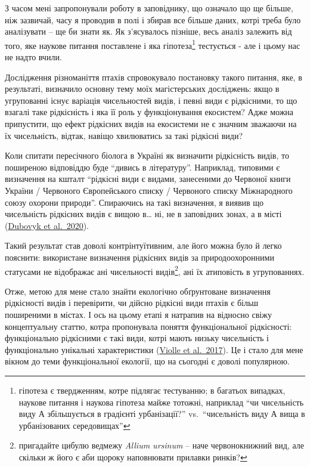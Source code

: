 \documentclass[
  11pt,
]{book}
\begin{document}
З часом мені запропонували роботу в заповіднику, що означало що ще більше, ніж зазвичай, часу я проводив в полі і збирав все більше даних, котрі треба було аналізувати -- ще би знати як. Як з'ясувалось пізніше, весь аналіз залежить від того, яке наукове питання поставлене і яка гіпотеза\footnote{гіпотеза є твердженням, котре підлягає тестуванню; в багатьох випадках, наукове питання і наукова гіпотеза майже тотожні, наприклад ``чи чисельність виду А збільшується в градієнті урбанізації?'' vs.~``чисельність виду А вища в урбанізованих середовищах''} тестується - але і цьому нас не надто вчили.

Дослідження різноманіття птахів спровокувало постановку такого питання, яке, в результаті, визначило основну тему моїх магістерських досліджень: якщо в угрупованні існує варіація чисельностей видів, і певні види є рідкісними, то що взагалі таке рідкісність і яка її роль у функціонування екосистем? Адже можна припустити, що ефект рідкісних видів на екосистеми не є значним зважаючи на їх чисельність, відтак, навіщо хвилюватись за такі рідкісні види?

Коли спитати пересічного біолога в Україні як визначити рідкісність видів, то поширеною відповіддю буде ``дивись в літературу''. Наприклад, типовими є визначення на кшталт ``рідкісні види є видами, занесеними до Червоної книги України / Червоного Європейського списку / Червоного списку Міжнародного союзу охорони природи''. Спираючись на такі визначення, я виявив що чисельність рідкісних видів є вищою в\ldots{} ні, не в заповідних зонах, а в місті (\href{http://doi.org/10.15407/gb1904}{Dubovyk et al.~2020}).

Такий результат став доволі контрінтуїтивним, але його можна було й легко пояснити: використане визначення рідкісних видів за природоохоронними статусами не відображає ані чисельності видів\footnote{пригадайте цибулю ведмежу \emph{Allium ursinum} -- наче червонокнижний вид, але скільки ж його є аби щороку наповнювати прилавки ринків?}, ані їх атиповість в угрупованнях.

Отже, метою для мене стало знайти екологічно обґрунтоване визначення рідкісності видів і перевірити, чи дійсно рідкісні види птахів є більш поширеними в містах. І ось на цьому етапі я натрапив на відносно свіжу концептуальну статтю, котра пропонувала поняття функціональної рідкісності: функціонально рідкісними є такі види, котрі мають низьку чисельність і функціонально унікальні характеристики (\href{https://doi.org/10.1016/j.tree.2017.02.002}{Violle et al.~2017}). Це і стало для мене вікном до теми функціональної екології, що на сьогодні є доволі популярною.
\end{document}
